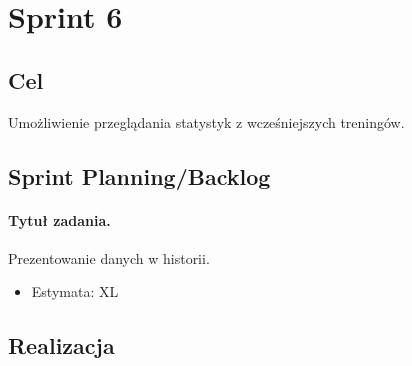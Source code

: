 \documentclass[a4paper]{article}
\begin{document}
\section{Sprint 6}

\subsection{Cel} Umożliwienie przeglądania statystyk z wcześniejszych treningów.

\subsection{Sprint Planning/Backlog}

\paragraph{Tytuł zadania.} Prezentowanie danych w historii.
\begin{itemize}
\item Estymata: XL
\end{itemize}

\subsection{Realizacja}
\end{document}

